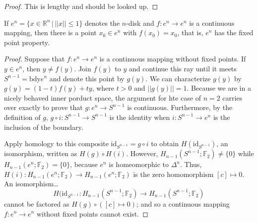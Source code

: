 \begin{proof}
This is lengthy and should be looked up.
\end{proof}

\begin{theorem}
If $e^n = \{ x \in \mathbb{R}^n \, | \, ||x|| \leq 1 \}$ denotes the $n$-disk and $f :e^n \rightarrow e^n$ is a
continuous mapping, then there is a point $x_0 \in e^n$ with $f(x_0) = x_0$, that is, $e^n$ has the fixed point
property.
\end{theorem}

\begin{proof}
Suppose that $f : e^n \rightarrow e^n$ is a continuous mapping without fixed points. If $y \in e^n$, then
$y \neq f(y)$. Join $f(y)$ to $y$ and continue this ray until it meets $S^{n-1} = \textrm{bdy}e^n$ and denote
this point by $g(y)$. We can characterize $g(y)$ by $g(y) = (1-t)f(y) + ty$, where $t>0$ and $||g(y)|| = 1$. Because
we are in a nicely behaved inner porduct space, the argument for hte case of $n=2$ carries over exactly to prove that
$g: e^n \rightarrow S^{n-1}$ is continuous. Furthermore, by the definition of $g$, $g \circ i : S^{n-1} \rightarrow S^{n-1}$
is the identity when $i : S^{n-1} \rightarrow e^n$ is the inclusion of the boundary.

Apply homology to this composite $\textrm{id}_{S^{n-1}} = g \circ i$ to obtain $H(\textrm{id}_{S^{n-1}})$, an isomorphism,
written as $H(g) \circ H(i)$. However, $H_{n-1}(S^{n-1}; \mathbb{F}_2) \neq \{ 0 \}$ while $H_{n-1}(e^n; \mathbb{F}_2) = \{ 0 \}$,
because $e^n$ is homeomorphic to $\Delta^n$. Thus, $H(i) : H_{n-1}(e^n; \mathbb{F}_2) \rightarrow H_{n-1}(e^n; \mathbb{F}_2)$
is the zero homomorphism $[c] \mapsto 0$. An isomorphism\dots
$$H(\textrm{id}_{S^{n-1}}: H_{n-1}(S^{n-1}; \mathbb{F}_2) \rightarrow H_{n-1}(S^{n-1}; \mathbb{F}_2)$$
cannot be factored as $H(g) \circ ([c] \mapsto 0)$; and so a continuous mapping $f: e^n \rightarrow e^n$ without
fixed points cannot exist.
\end{proof}
